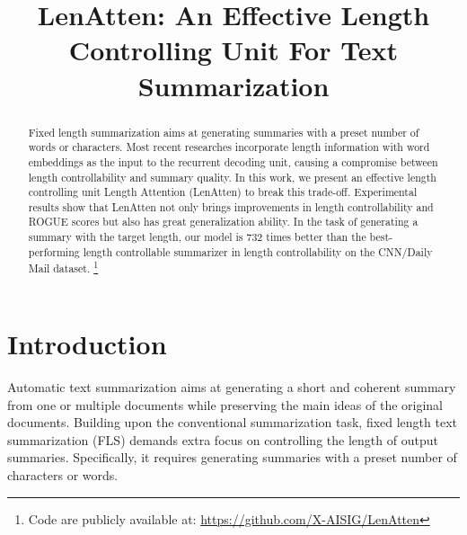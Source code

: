 \documentclass[11pt,a4paper]{article}
\title{LenAtten: An Effective Length Controlling Unit For Text Summarization}
\author{
Zhongyi Yu\Thanks{\hskip 0.5em Equal Contribution}\protect\phantom{\footnotesize 1}\textsuperscript{,}$^{1}$,\hskip 1em
{\bf Zhenghao Wu\footnotemark[1]\protect\phantom{\footnotesize 1}\textsuperscript{,}$^{1}$},\hskip 1em
{\bf Hao Zheng$^1$,}\\
{\bf Zhe XuanYuan$^2$\textsuperscript{,}$^{3}$,}\hskip 0.6em{\bf Jefferson Fong$^1$,}\hskip 1.3em{\bf Weifeng Su\Thanks{\hskip 0.5em Corresponding author}\protect\phantom{\footnotesize 1}\textsuperscript{,}$^{1}$\textsuperscript{,}$^{3}$} \\
  $^1$Computer Science and Technology Programme, $^2$Data Science Programme\\
  Division of Science and Technology\\
  $^3$Guangdong Key Lab of AI and Multi-Modal Data Processing\\BNU-HKBU United International College, Zhuhai, China \\
  \texttt{\{zhongyicst,zhecwu,zhslzwd97\}@gmail.com}\\
  \texttt{\{zhexuanyuan,jeffersonfong,wfsu\}@uic.edu.cn}\\
  }
\date{}
\begin{document}
\maketitle
\begin{abstract}
Fixed length summarization aims at generating summaries with a preset number of words or characters. Most recent researches incorporate length information with word embeddings as the input to the recurrent decoding unit, causing a compromise between length controllability and summary quality. In this work, we present an effective length controlling unit Length Attention (LenAtten) to break this trade-off. Experimental results show that LenAtten not only brings improvements in length controllability and ROGUE scores but also has great generalization ability. In the task of generating a summary with the target length, our model is 732 times better than the best-performing length controllable summarizer in length controllability on the CNN/Daily Mail dataset. \footnote{Code are publicly available at: \url{https://github.com/X-AISIG/LenAtten}} 

\end{abstract}

\section{Introduction}

Automatic text summarization aims at generating a short and coherent summary from one or multiple documents while preserving the main ideas of the original documents. Building upon the conventional summarization task, fixed length text summarization (FLS) demands extra focus on controlling the length of output summaries. Specifically, it requires generating summaries with a preset number of characters or words.
\end{document}
